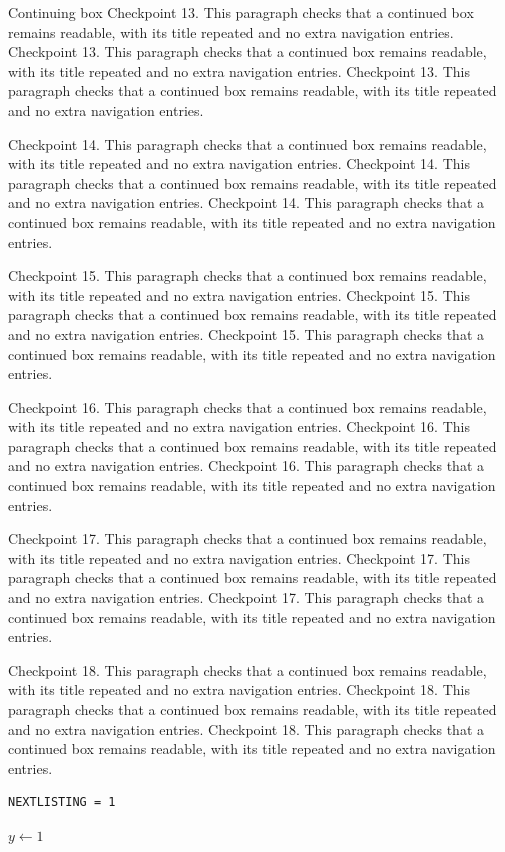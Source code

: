 \documentclass[algorithms,listings]{tempusreport}
\begin{document}
\begin{reportbox}{Continuing box}
Checkpoint 13. This paragraph checks that a continued box remains readable, with its title repeated and no extra navigation entries. Checkpoint 13. This paragraph checks that a continued box remains readable, with its title repeated and no extra navigation entries. Checkpoint 13. This paragraph checks that a continued box remains readable, with its title repeated and no extra navigation entries.

Checkpoint 14. This paragraph checks that a continued box remains readable, with its title repeated and no extra navigation entries. Checkpoint 14. This paragraph checks that a continued box remains readable, with its title repeated and no extra navigation entries. Checkpoint 14. This paragraph checks that a continued box remains readable, with its title repeated and no extra navigation entries.

Checkpoint 15. This paragraph checks that a continued box remains readable, with its title repeated and no extra navigation entries. Checkpoint 15. This paragraph checks that a continued box remains readable, with its title repeated and no extra navigation entries. Checkpoint 15. This paragraph checks that a continued box remains readable, with its title repeated and no extra navigation entries.

Checkpoint 16. This paragraph checks that a continued box remains readable, with its title repeated and no extra navigation entries. Checkpoint 16. This paragraph checks that a continued box remains readable, with its title repeated and no extra navigation entries. Checkpoint 16. This paragraph checks that a continued box remains readable, with its title repeated and no extra navigation entries.

Checkpoint 17. This paragraph checks that a continued box remains readable, with its title repeated and no extra navigation entries. Checkpoint 17. This paragraph checks that a continued box remains readable, with its title repeated and no extra navigation entries. Checkpoint 17. This paragraph checks that a continued box remains readable, with its title repeated and no extra navigation entries.

Checkpoint 18. This paragraph checks that a continued box remains readable, with its title repeated and no extra navigation entries. Checkpoint 18. This paragraph checks that a continued box remains readable, with its title repeated and no extra navigation entries. Checkpoint 18. This paragraph checks that a continued box remains readable, with its title repeated and no extra navigation entries.
\end{reportbox}
\begin{lstlisting}[caption={Next logical listing.},label={lst:next}]
NEXTLISTING = 1
\end{lstlisting}
\begin{algorithm}[htbp]
\caption{Next logical algorithm.}\label{alg:next}
\begin{algorithmic}[1]\State $y\gets1$\end{algorithmic}
\end{algorithm}
\clearpage\lstlistoflistings\listofalgorithms
\end{document}

